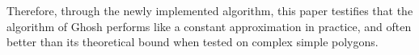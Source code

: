 Therefore, through the newly implemented algorithm, this paper \cite{maleki2022implementation} testifies that the algorithm of Ghosh \cite{GHOSH2010718} performs like a constant approximation in practice, and often better than its theoretical bound when tested on complex simple polygons.
